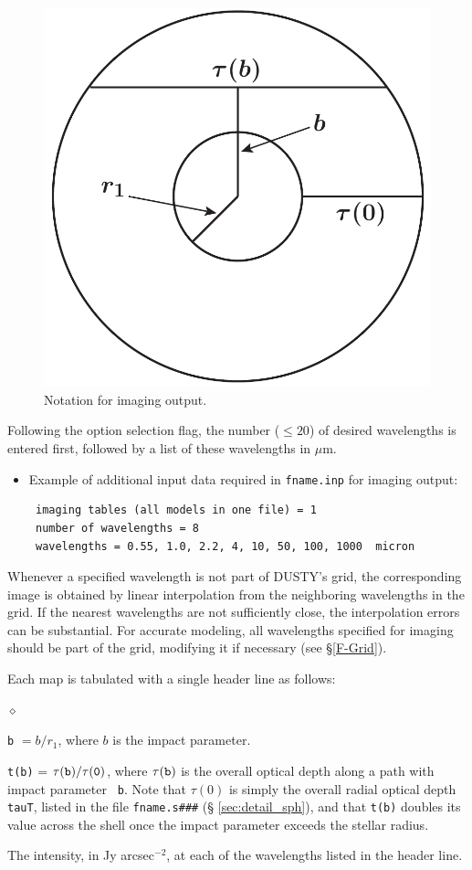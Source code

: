 \documentclass[11pt]{article}
\def\D    {{\sf DUSTY}}
\def\mic    {\hbox{$\mu$m}}
\begin{document}
\begin{figure}[ht]
  \centering
  \includegraphics[width=0.40\hsize]{sphere}
  \caption{Notation for imaging output.}
  \label{impact parameter}
\end{figure}

Following the option selection flag, the number ($\le 20$) of desired
wavelengths is entered first, followed by a list of these wavelengths
in \mic.

\begin{itemize}
\item Example of additional input data required in {\tt fname.inp} for
  imaging output:
\begin{verbatim}
 imaging tables (all models in one file) = 1
 number of wavelengths = 8
 wavelengths = 0.55, 1.0, 2.2, 4, 10, 50, 100, 1000  micron
\end{verbatim}
\end{itemize}
Whenever a specified wavelength is not part of \D's grid, the
corresponding image is obtained by linear interpolation from the
neighboring wavelengths in the grid.  If the nearest wavelengths are
not sufficiently close, the interpolation errors can be
substantial. For accurate modeling, all wavelengths specified for
imaging should be part of the grid, modifying it if necessary (see
\S\ref{F-Grid}).

Each map is tabulated with a single header line as follows:
\begin{list}{$\diamond$}{}
\item{\tt b} $= b/r_1$, where $b$ is the impact parameter.
\item {\tt t(b)} = $\tau(\tt b)/\tau(0)$, where $\tau(\tt b)$ is the
  overall optical depth along a path with impact parameter {\tt
    b}. Note that $\tau(0)$ is simply the overall radial optical depth
  {\tt tauT}, listed in the file {\tt fname.s\#\#\#} (\S
  \ref{sec:detail_sph}), and that {\tt t(b)} doubles its value across
  the shell once the impact parameter exceeds the stellar radius.
\item The intensity, in Jy arcsec$^{-2}$, at each of the wavelengths
  listed in the header line.
\end{list}
\end{document}
